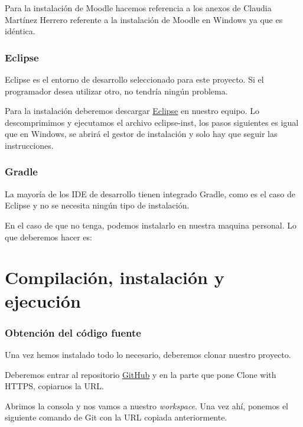 Para la instalación de Moodle hacemos referencia a los anexos de Claudia Martínez Herrero \cite{claudia:anexo} referente a la instalación de Moodle en Windows ya que es idéntica.

\subsubsection{Eclipse}\label{eclipse}

Eclipse es el entorno de desarrollo seleccionado para este proyecto. Si el programador desea utilizar otro, no tendría ningún problema.

Para la instalación deberemos descargar \href{http://www.eclipse.org/downloads/}{Eclipse} en nuestro equipo. Lo descomprimimos y ejecutamos el archivo eclipse-inst, los pasos siguientes es igual que en Windows, se abrirá el gestor de instalación y solo hay que seguir las instrucciones.

\subsubsection{Gradle}\label{git}

La mayoría de los IDE de desarrollo tienen integrado Gradle, como es el caso de Eclipse y no se necesita ningún tipo de instalación.

En el caso de que no tenga, podemos instalarlo en nuestra maquina personal. Lo que deberemos hacer es:


\section{Compilación, instalación y ejecución}

\subsubsection{Obtención del código fuente}\label{obtención-del-código-fuente}

Una vez hemos instalado todo lo necesario, deberemos clonar nuestro proyecto.

Deberemos entrar al repositorio \href{https://github.com/trona85/GII-17.1B-UBULog-1.0}{GitHub} y en la parte que pone Clone with HTTPS, copiarnos la URL.


Abrimos la consola y nos vamos a nuestro \emph{workspace}. Una vez ahí, ponemos el siguiente comando de Git con la URL copiada anteriormente.

